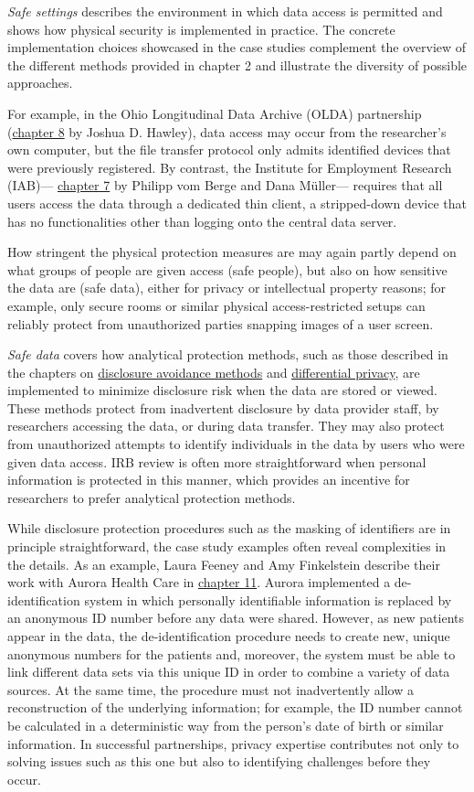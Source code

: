 \documentclass[
]{WileySix}
\begin{document}
\emph{Safe settings} describes the environment in which data access is permitted and shows how physical security is implemented in practice. The concrete implementation choices showcased in the case studies complement the overview of the different methods provided in chapter 2 and illustrate the diversity of possible approaches.

For example, in the Ohio Longitudinal Data Archive (OLDA) partnership (\protect\hyperlink{olda}{chapter 8} by Joshua D. Hawley), data access may occur from the researcher's own computer, but the file transfer protocol only admits identified devices that were previously registered. By contrast, the Institute for Employment Research (IAB)--- \protect\hyperlink{iab}{chapter 7} by Philipp vom Berge and Dana Müller--- requires that all users access the data through a dedicated thin client, a stripped-down device that has no functionalities other than logging onto the central data server.

How stringent the physical protection measures are may again partly depend on what groups of people are given access (safe people), but also on how sensitive the data are (safe data), either for privacy or intellectual property reasons; for example, only secure rooms or similar physical access-restricted setups can reliably protect from unauthorized parties snapping images of a user screen.

\emph{Safe data} covers how analytical protection methods, such as those described in the chapters on \protect\hyperlink{discavoid}{disclosure avoidance methods} and \protect\hyperlink{diffpriv}{differential privacy}, are implemented to minimize disclosure risk when the data are stored or viewed. These methods protect from inadvertent disclosure by data provider staff, by researchers accessing the data, or during data transfer. They may also protect from unauthorized attempts to identify individuals in the data by users who were given data access. IRB review is often more straightforward when personal information is protected in this manner, which provides an incentive for researchers to prefer analytical protection methods.

While disclosure protection procedures such as the masking of identifiers are in principle straightforward, the case study examples often reveal complexities in the details. As an example, Laura Feeney and Amy Finkelstein describe their work with Aurora Health Care in \protect\hyperlink{ahc}{chapter 11}. Aurora implemented a de-identification system in which personally identifiable information is replaced by an anonymous ID number before any data were shared. However, as new patients appear in the data, the de-identification procedure needs to create new, unique anonymous numbers for the patients and, moreover, the system must be able to link different data sets via this unique ID in order to combine a variety of data sources. At the same time, the procedure must not inadvertently allow a reconstruction of the underlying information; for example, the ID number cannot be calculated in a deterministic way from the person's date of birth or similar information. In successful partnerships, privacy expertise contributes not only to solving issues such as this one but also to identifying challenges before they occur.
\end{document}
